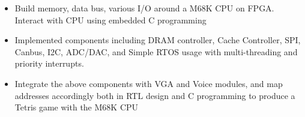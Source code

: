 \documentclass[10pt,a4paper,ragged2e,withhyper]{altacv}
\begin{document}
\begin{paracol}{2}
\divider

\begin{itemize}
\item Build {memory, data bus, various I/O} around a M68K CPU on FPGA. Interact with CPU using embedded C programming
\item Implemented components including {DRAM controller, Cache Controller, SPI, Canbus, I2C, ADC/DAC}, and {Simple RTOS} usage with multi-threading and priority interrupts.
\item Integrate the above components with VGA and Voice modules, and map addresses accordingly both in RTL design and C programming to produce a Tetris game with the M68K CPU
\end{itemize}



\medskip







\end{paracol}
\end{document}
